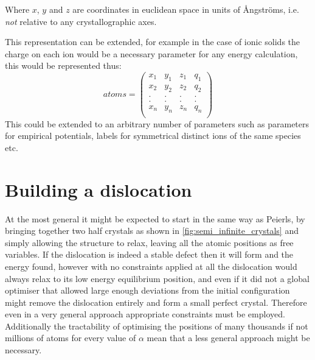 Where $x$, $y$ and $z$ are coordinates in euclidean space in units of \r{A}ngstr\"{o}ms, i.e. \emph{not} relative to any crystallographic axes.

This representation can be extended, for example in the case of ionic solids the charge on each ion would be a necessary parameter for any energy calculation, this would be represented thus:
$$
atoms = \begin{pmatrix}
x_1 & y_1 & z_1 & q_1 \\
x_2 & y_2 & z_2 & q_2 \\
.   &.    &.    &.    \\
.   &.    &.    &.    \\
x_n & y_n & z_n & q_n \\
\end{pmatrix}
$$
This could be extended to an arbitrary number of parameters such as parameters for empirical potentials, labels for symmetrical distinct ions of the same species etc.























\FloatBarrier
\section{Building a dislocation}
\FloatBarrier
\label{sec:build}

At the most general it might be expected to start in the same way as Peierls, by bringing together two half crystals as shown in \autoref{fig:semi_infinite_crystals} and simply allowing the structure to relax, leaving all the atomic positions as free variables. If the dislocation is indeed a stable defect then it will form and the energy found, however with no constraints applied at all the dislocation would always relax to its low energy equilibrium position, and even if it did not a global optimiser that allowed large enough deviations from the initial configuration might remove the dislocation entirely and form a small perfect crystal. Therefore even in a very general approach appropriate constraints must be employed. Additionally the tractability of optimising the positions of many thousands if not millions of atoms for every value of $\alpha$ mean that a less general approach might be necessary. 

